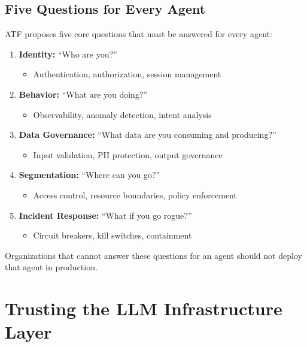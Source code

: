 \subsection{Five Questions for Every Agent}
\label{subsec:five-questions}

ATF proposes five core questions that must be answered for every agent:

\begin{enumerate}
    \item \textbf{Identity:} ``Who are you?''
    \begin{itemize}
        \item Authentication, authorization, session management
    \end{itemize}

    \item \textbf{Behavior:} ``What are you doing?''
    \begin{itemize}
        \item Observability, anomaly detection, intent analysis
    \end{itemize}

    \item \textbf{Data Governance:} ``What data are you consuming and producing?''
    \begin{itemize}
        \item Input validation, PII protection, output governance
    \end{itemize}

    \item \textbf{Segmentation:} ``Where can you go?''
    \begin{itemize}
        \item Access control, resource boundaries, policy enforcement
    \end{itemize}

    \item \textbf{Incident Response:} ``What if you go rogue?''
    \begin{itemize}
        \item Circuit breakers, kill switches, containment
    \end{itemize}
\end{enumerate}

Organizations that cannot answer these questions for an agent should not deploy that agent in production.

\section{Trusting the LLM Infrastructure Layer}
\label{sec:llm-infrastructure-trust}

